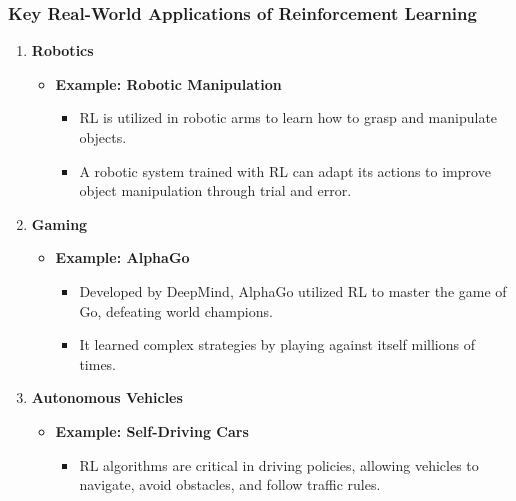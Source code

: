 \documentclass[aspectratio=169]{beamer}
\begin{document}
\begin{frame}[fragile]
    \frametitle{Key Real-World Applications of Reinforcement Learning}
    \begin{enumerate}
        \item \textbf{Robotics}
            \begin{itemize}
                \item \textbf{Example: Robotic Manipulation}
                \begin{itemize}
                    \item RL is utilized in robotic arms to learn how to grasp and manipulate objects.
                    \item A robotic system trained with RL can adapt its actions to improve object manipulation through trial and error.
                \end{itemize}
            \end{itemize}
        \item \textbf{Gaming}
            \begin{itemize}
                \item \textbf{Example: AlphaGo}
                \begin{itemize}
                    \item Developed by DeepMind, AlphaGo utilized RL to master the game of Go, defeating world champions.
                    \item It learned complex strategies by playing against itself millions of times.
                \end{itemize}
            \end{itemize}
        \item \textbf{Autonomous Vehicles}
            \begin{itemize}
                \item \textbf{Example: Self-Driving Cars}
                \begin{itemize}
                    \item RL algorithms are critical in driving policies, allowing vehicles to navigate, avoid obstacles, and follow traffic rules.
                \end{itemize}
            \end{itemize}
    \end{enumerate}
\end{frame}
\end{document}

